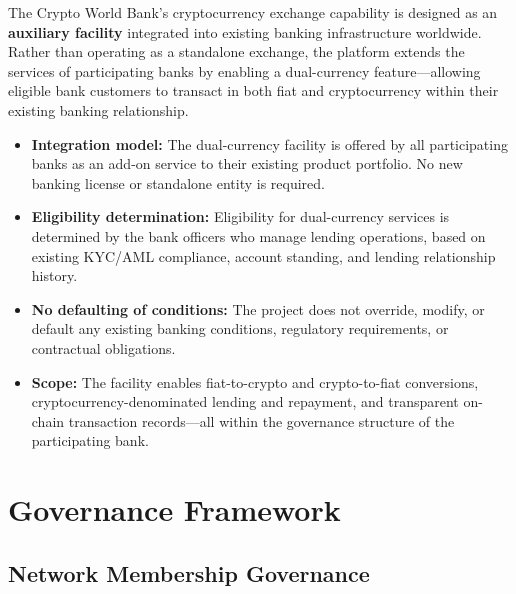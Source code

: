 \documentclass[12pt,a4paper]{report}
\begin{document}
The Crypto World Bank's cryptocurrency exchange capability is designed as an \textbf{auxiliary facility} integrated into existing banking infrastructure worldwide. Rather than operating as a standalone exchange, the platform extends the services of participating banks by enabling a dual-currency feature---allowing eligible bank customers to transact in both fiat and cryptocurrency within their existing banking relationship.

\begin{itemize}[noitemsep]
\item \textbf{Integration model:} The dual-currency facility is offered by all participating banks as an add-on service to their existing product portfolio. No new banking license or standalone entity is required.
\item \textbf{Eligibility determination:} Eligibility for dual-currency services is determined by the bank officers who manage lending operations, based on existing KYC/AML compliance, account standing, and lending relationship history.
\item \textbf{No defaulting of conditions:} The project does not override, modify, or default any existing banking conditions, regulatory requirements, or contractual obligations.
\item \textbf{Scope:} The facility enables fiat-to-crypto and crypto-to-fiat conversions, cryptocurrency-denominated lending and repayment, and transparent on-chain transaction records---all within the governance structure of the participating bank.
\end{itemize}


\section{Governance Framework}

\subsection{Network Membership Governance}
\end{document}
